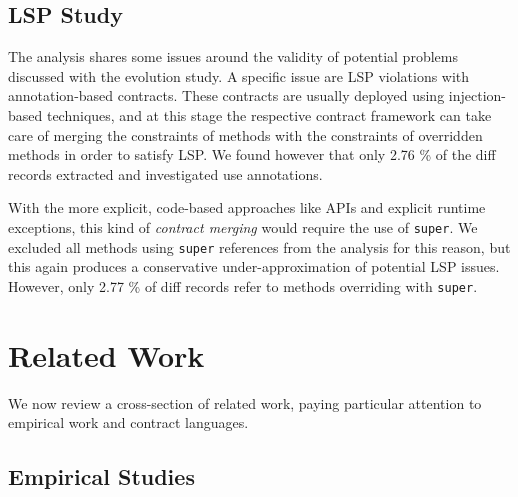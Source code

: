 \documentclass[a4paper,UKenglish]{lipics-v2016}
\begin{document}
\subsection{LSP Study}

The analysis shares some issues around the validity of potential problems discussed with the evolution study. A specific issue are LSP violations with annotation-based contracts. These contracts are usually deployed using injection-based techniques, and at this stage the respective contract framework can take care of merging the constraints of methods with the constraints of overridden methods in order to satisfy LSP. We found however that only 2.76 \% of the diff records extracted and investigated use annotations. 

With the more explicit, code-based approaches like APIs and explicit runtime exceptions, this kind of \textit{contract merging} would require the use of \texttt{super}. We excluded all methods using \texttt{super} references from the analysis for this reason, but this again produces a conservative under-approximation of potential LSP issues. However, only 2.77 \% of diff records refer to methods overriding with \texttt{super}. 



\section{Related Work} 

We now review a cross-section of related work, paying particular attention to empirical work and contract languages.

\subsection{Empirical Studies}
\end{document}
